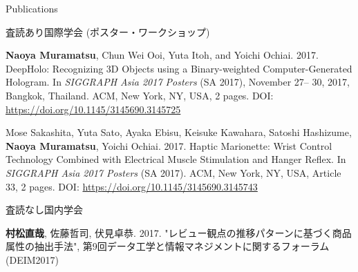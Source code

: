 \documentclass{resume} %
\begin{document}
\begin{rSection}{Publications}
\begin{rSubsection}{査読あり国際学会 (ポスター・ワークショップ)}{}{}{}{}
        \item \textbf{Naoya Muramatsu}, Chun Wei Ooi, Yuta Itoh, and Yoichi Ochiai. 2017. DeepHolo: Recognizing 3D Objects using a Binary-weighted Computer-Generated Hologram. In \textit{SIGGRAPH Asia 2017 Posters} (SA 2017), November 27– 30, 2017, Bangkok, Thailand. ACM, New York, NY, USA, 2 pages. DOI: \url{https://doi.org/10.1145/3145690.3145725}

        \item Mose Sakashita, Yuta Sato, Ayaka Ebisu, Keisuke Kawahara, Satoshi Hashizume, \textbf{Naoya Muramatsu}, Yoichi Ochiai. 2017. Haptic Marionette: Wrist Control Technology Combined with Electrical Muscle Stimulation and Hanger Reflex. In \textit{SIGGRAPH Asia 2017 Posters} (SA 2017). ACM, New York, NY, USA, Article 33, 2 pages. DOI: \url{https://doi.org/10.1145/3145690.3145743}
    \end{rSubsection}



    \begin{rSubsection}{査読なし国内学会}{}{}{}{}
        \item \textbf{村松直哉}, 佐藤哲司, 伏見卓恭. 2017. "レビュー観点の推移パターンに基づく商品属性の抽出手法", 第9回データ工学と情報マネジメントに関するフォーラム (DEIM2017)
    \end{rSubsection}




\end{rSection}
\end{document}
